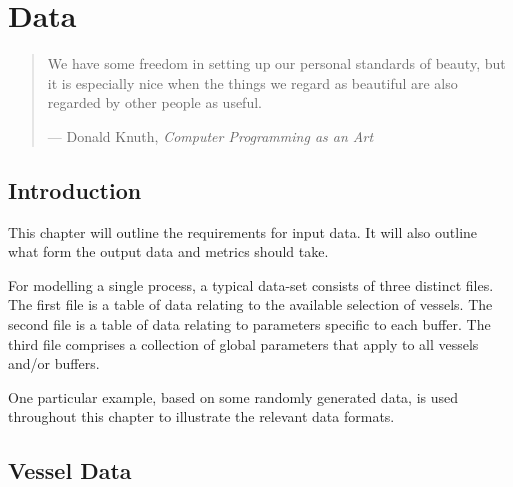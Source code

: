 %
%
%
%

\chapter{Data}\label{C.data}

\begin{quote}
We have some freedom in setting up our personal standards of beauty, but it is
especially nice when the things we regard as beautiful are also regarded by
other people as useful.

\hspace{2cm}--- Donald Knuth, \emph{Computer Programming as an Art}
\end{quote}

\section{Introduction}\label{S.intro3}
This chapter will outline the requirements for input data.
It will also outline what form the output data and metrics should take.

For modelling a single process, a typical data-set consists of three distinct
files.
The first file is a table of data relating to the available selection of
vessels.
The second file is a table of data relating to parameters specific
to each buffer.
The third file comprises a collection of global parameters
that apply to all vessels and/or buffers.

One particular example, based on some randomly generated data, is used
throughout this chapter to illustrate the relevant data formats.

\section{Vessel Data}\label{S.vesseldata}

